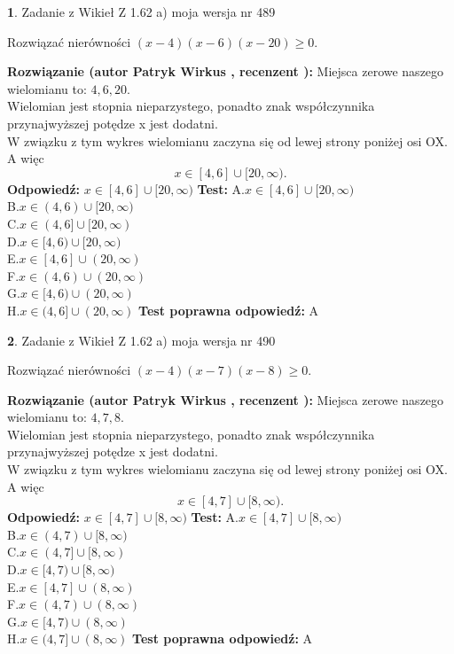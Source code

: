 \documentclass[12pt, a4paper]{article}
\theoremstyle{definition} %
\newtheorem{zad}{}
\newcommand{\zadStart}[1]{\begin{zad}#1\newline}
\newcommand{\zadStop}{\end{zad}}
\newcommand{\rozwStart}[2]{\noindent \textbf{Rozwiązanie (autor #1 , recenzent #2): }\newline}
\newcommand{\rozwStop}{\newline}
\newcommand{\odpStart}{\noindent \textbf{Odpowiedź:}\newline}
\newcommand{\odpStop}{\newline}
\newcommand{\testStart}{\noindent \textbf{Test:}\newline}
\newcommand{\testStop}{\newline}
\newcommand{\kluczStart}{\noindent \textbf{Test poprawna odpowiedź:}\newline}
\newcommand{\kluczStop}{\newline}
\begin{document}
\zadStart{Zadanie z Wikieł Z 1.62 a) moja wersja nr 489}

Rozwiązać nierówności $(x-4)(x-6)(x-20)\ge0$.
\zadStop
\rozwStart{Patryk Wirkus}{}
Miejsca zerowe naszego wielomianu to: $4, 6, 20$.\\
Wielomian jest stopnia nieparzystego, ponadto znak współczynnika przy\linebreak najwyższej potędze x jest dodatni.\\ W związku z tym wykres wielomianu zaczyna się od lewej strony poniżej osi OX. A więc $$x \in [4,6] \cup [20,\infty).$$
\rozwStop
\odpStart
$x \in [4,6] \cup [20,\infty)$
\odpStop
\testStart
A.$x \in [4,6] \cup [20,\infty)$\\
B.$x \in (4,6) \cup [20,\infty)$\\
C.$x \in (4,6] \cup [20,\infty)$\\
D.$x \in [4,6) \cup [20,\infty)$\\
E.$x \in [4,6] \cup (20,\infty)$\\
F.$x \in (4,6) \cup (20,\infty)$\\
G.$x \in [4,6) \cup (20,\infty)$\\
H.$x \in (4,6] \cup (20,\infty)$
\testStop
\kluczStart
A
\kluczStop



\zadStart{Zadanie z Wikieł Z 1.62 a) moja wersja nr 490}

Rozwiązać nierówności $(x-4)(x-7)(x-8)\ge0$.
\zadStop
\rozwStart{Patryk Wirkus}{}
Miejsca zerowe naszego wielomianu to: $4, 7, 8$.\\
Wielomian jest stopnia nieparzystego, ponadto znak współczynnika przy\linebreak najwyższej potędze x jest dodatni.\\ W związku z tym wykres wielomianu zaczyna się od lewej strony poniżej osi OX. A więc $$x \in [4,7] \cup [8,\infty).$$
\rozwStop
\odpStart
$x \in [4,7] \cup [8,\infty)$
\odpStop
\testStart
A.$x \in [4,7] \cup [8,\infty)$\\
B.$x \in (4,7) \cup [8,\infty)$\\
C.$x \in (4,7] \cup [8,\infty)$\\
D.$x \in [4,7) \cup [8,\infty)$\\
E.$x \in [4,7] \cup (8,\infty)$\\
F.$x \in (4,7) \cup (8,\infty)$\\
G.$x \in [4,7) \cup (8,\infty)$\\
H.$x \in (4,7] \cup (8,\infty)$
\testStop
\kluczStart
A
\kluczStop
\end{document}
